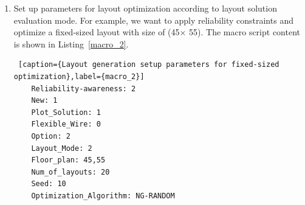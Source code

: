 \documentclass[11pt]{article}
\begin{document}
\begin{enumerate}
    \item Set up parameters for layout optimization according to layout solution evaluation mode. For example, we want to apply reliability constraints and optimize a fixed-sized layout with size of (45× 55). The macro script content is shown in Listing~\ref{macro_2}.

    \begin{lstlisting} [caption={Layout generation setup parameters for fixed-sized optimization},label={macro_2}]
    Reliability-awareness: 2
    New: 1
    Plot_Solution: 1
    Flexible_Wire: 0
    Option: 2
    Layout_Mode: 2
    Floor_plan: 45,55 
    Num_of_layouts: 20
    Seed: 10
    Optimization_Algorithm: NG-RANDOM

    \end{lstlisting}
    

\end{enumerate}
\end{document}
